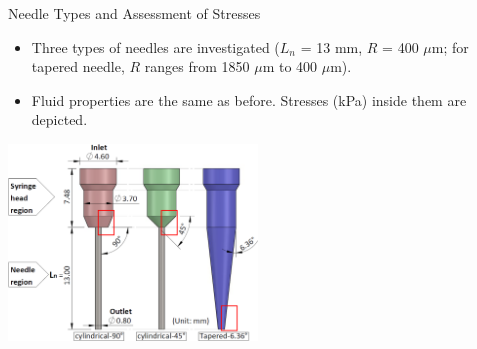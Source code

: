 \begin{frame}{Needle Types and Assessment of Stresses}

\begin{itemize}
\setlength{\itemsep}{1mm}
\item Three types of needles are investigated ($L_n$ = 13 mm, $R$ = 400 $\mu$m; for tapered needle, $R$ ranges from 1850 $\mu$m to 400 $\mu$m).
\item Fluid properties are the same as before. Stresses (kPa) inside them are depicted.
\end{itemize}

\centering
\includegraphics[trim = 0mm 0mm 0mm 0mm, clip, width=2.6in]{./images/needle_setup.png}
\centering
\setlength{\fboxrule}{1pt}
\setlength{\fboxsep}{1pt}

\end{frame}


